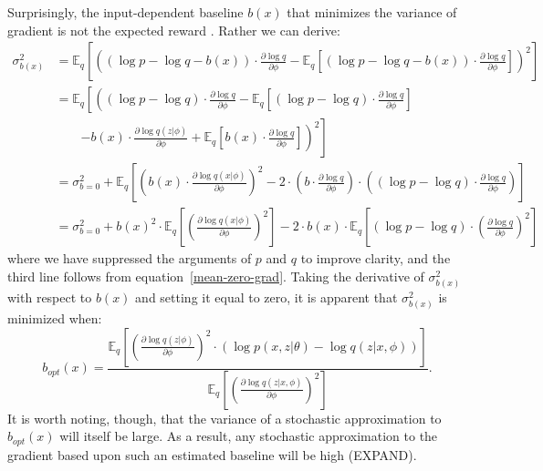 \documentclass{article} %
\begin{document}
Surprisingly, the input-dependent baseline $b(x)$ that minimizes the variance of gradient is not the expected reward \cite{weaver2001optimal, greensmith2004variance}.  Rather we can derive:
\begin{align*}
\sigma_{b(x)}^2 &= \mathbb{E}_q \left[ \left( \left( \log p - \log q - b(x) \right) \cdot \frac{\partial \log q}{\partial \phi}  %
- \mathbb{E}_q \left[ \left( \log p - \log q - b(x) \right) \cdot \frac{\partial \log q}{\partial \phi} \right] \right)^2
\right] \\
&= \mathbb{E}_q \left[ \left( \left( \log p - \log q \right) \cdot \frac{\partial \log q}{\partial \phi}  
- \mathbb{E}_q \left[ \left( \log p - \log q \right) \cdot \frac{\partial \log q}{\partial \phi}  \right] \right. \right. \\
&\qquad \left. \left. - b(x) \cdot \frac{\partial \log q(z| \phi)}{\partial \phi} + \mathbb{E}_q \left[ b(x) \cdot \frac{\partial \log q}{\partial \phi} \right] \right)^2 \right] \\
&= \sigma_{b = 0}^2 + \mathbb{E}_q \left[ \left( b(x) \cdot \frac{\partial \log q(x|\phi) }{ \partial \phi } \right)^2
- 2 \cdot \left(b \cdot \frac{ \partial \log q}{ \partial \phi } \right) \cdot \left( \left( \log p - \log q \right) \cdot \frac{\partial \log q}{\partial \phi} \right) \right] \\
&= \sigma_{b = 0}^2 + b(x)^2 \cdot \mathbb{E}_q \left[ \left( \frac{\partial \log q(x|\phi) }{ \partial \phi } \right)^2 \right]
- 2 \cdot b(x) \cdot  \mathbb{E}_q \left[ \left( \log p - \log q \right) \cdot \left( \frac{\partial \log q}{\partial \phi} \right)^2 \right]
\end{align*}
where we have suppressed the arguments of $p$ and $q$ to improve clarity, and the third line follows from equation~\ref{mean-zero-grad}.  Taking the derivative of $\sigma_{b(x)}^2$ with respect to $b(x)$ and setting it equal to zero, it is apparent that $\sigma_{b(x)}^2$ is minimized when:
\begin{equation} \label{minimal-variance-baseline}
b_{opt}(x) = \frac{\mathbb{E}_q \left[ \left( \frac{ \partial \log q(z|\phi)}{\partial \phi} \right)^2 \cdot \left( \log p(x,z | \theta) - \log q(z | x, \phi) \right) \right]}
{ \mathbb{E}_q \left[ \left( \frac{ \partial \log q(z | x, \phi) }{\partial \phi} \right)^2 \right] } .
\end{equation}
It is worth noting, though, that the variance of a stochastic approximation to $b_{opt}(x)$ will itself be large.  As a result, any stochastic approximation to the gradient based upon such an estimated baseline will be high (EXPAND).
\end{document}
